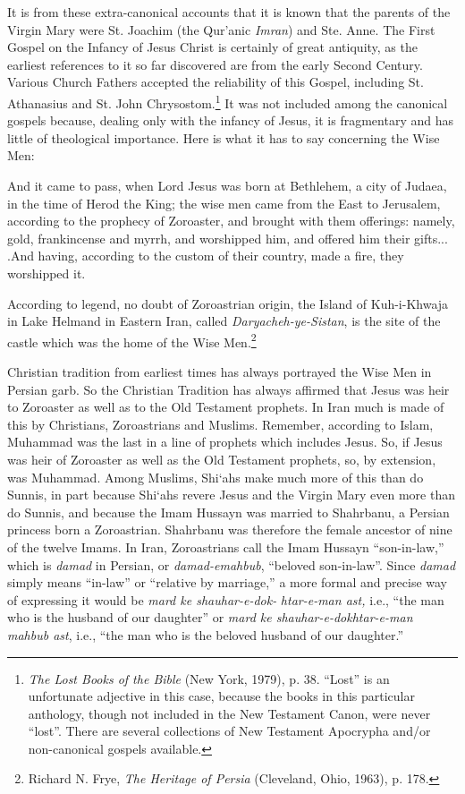 It is from these extra-canonical accounts that it is known that the parents of the Virgin Mary were St. Joachim (the Qur'anic \emph{Imran}) and Ste. Anne. The First Gospel on the Infancy of Jesus Christ is certainly of great antiquity, as the earliest references to it so far discovered are from the early Second Century. Various Church Fathers accepted the reliability of this Gospel, including St. Athanasius and St. John Chrysostom.\footnote{\emph{The Lost Books of the Bible} (New York, 1979), p. 38. ``Lost'' is an unfortunate adjective in this case, because the books in this particular anthology, though not included in the New Testament Canon, were never ``lost''. There are several collections of New Testament Apocrypha and/or non-canonical gospels available.} It was not included among the canonical gospels because, dealing only with the infancy of Jesus, it is fragmentary and has little of theological importance. Here is what it has to say concerning the Wise Men:

\begin{quotex}
And it came to pass, when Lord Jesus was born at Bethlehem, a city of Judaea, in the time of Herod the King; the wise men came from the East to Jerusalem, according to the prophecy of Zoroaster, and brought with them offerings: namely, gold, frankincense and myrrh, and worshipped him, and offered him their gifts... .And having, according to the custom of their country, made a fire, they worshipped it.
\end{quotex}


According to legend, no doubt of Zoroastrian origin, the Island of Kuh-i-Khwaja in Lake Helmand in Eastern Iran, called \emph{Daryacheh-ye-Sistan}, is the site of the castle which was the home of the Wise Men.\footnote{Richard N. Frye, \emph{The Heritage of Persia} (Cleveland, Ohio, 1963), p. 178.}

Christian tradition from earliest times has always portrayed the Wise Men in Persian garb. So the Christian Tradition has always affirmed that Jesus was heir to Zoroaster as well as to the Old Testament prophets. In Iran much is made of this by Christians, Zoroastrians and Muslims. Remember, according to Islam, Muhammad was the last in a line of prophets which includes Jesus. So, if Jesus was heir of Zoroaster as well as the Old Testament prophets, so, by extension, was Muhammad. Among Muslims, Shi`ahs make much more of this than do Sunnis, in part because Shi`ahs revere Jesus and the Virgin Mary even more than do Sunnis, and because the Imam Hussayn was married to Shahrbanu, a Persian princess born a Zoroastrian. Shahrbanu was therefore the female ancestor of nine of the twelve Imams. In Iran, Zoroastrians call the Imam Hussayn ``son-in-law,'' which is \emph{damad} in Persian, or \emph{damad-emahbub}, ``beloved son-in-law''. Since \emph{damad} simply means ``in-law'' or ``relative by marriage,'' a more formal and precise way of expressing it would be \emph{mard ke shauhar-e-dok-} \emph{htar-e-man ast,} i.e., ``the man who is the husband of our daughter'' or \emph{mard ke shauhar-e-dokhtar-e-man mahbub ast}, i.e., ``the man who is the beloved husband of our daughter.''

